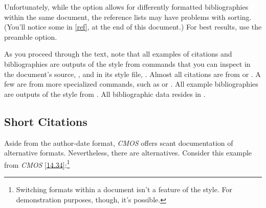 \documentclass[11pt,letterpaper,oneside]{article}
\begin{document}
\noindent Unfortunately, while the  option allows for
differently formatted bibliographies within the same document, the
reference lists may have problems with sorting. (You'll notice some in
\ref{ref}, at the end of this document.) For best results, use the
 preamble option.

As you proceed through the text, note that all examples of citations
and bibliographies are outputs of the style from commands that you can
inspect in the document's source, , and in its
style file, . Almost all citations are from
 or . A few are from more specialized
commands, such as  or . All example
bibliographies are outputs of the style from .
All bibliographic data resides in .

\subsection{Short Citations}
\label{short}

Aside from the author-date format, \textit{CMOS} offers scant
documentation of alternative formats. Nevertheless, there are
alternatives. Consider this example from \textit{CMOS}
\ref{14.34}:\footnote{Switching formats within a document isn't a
feature of the style. For demonstration purposes, though, it's
possible.}

\begin{citeonly}
\item \cite[3]{morrison2004a}
\item \cite[18]{morrison2004a}
\item \cite[18]{morrison2004a}
\item \cite[24--26]{morrison2004a}
\item \cite[401-2]{morrison2004b}
\item \cite[433]{morrison2004b}
\item \cite[37--38]{diaz2008}
\item \cite[403]{morrison2004b}
\item \cite[152]{diaz2008}
\item \cite[201-2]{diaz2008}
\item \cites[240]{morrison2004b}[32]{morrison2004a}
\item \cite[33]{morrison2004a}
\end{citeonly}
\end{document}
